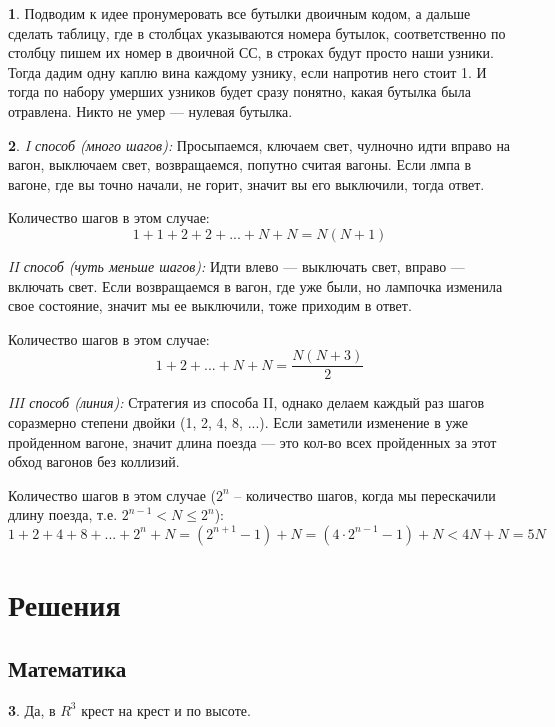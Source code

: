 \documentclass[14pt, a4paper]{extarticle}
\theoremstyle{definition}
\newtheorem{problem}{}
\theoremstyle{definition}
\theoremstyle{remark}
\numberwithin{equation}{section}
\begin{document}
\begin{problem}
    Подводим к идее пронумеровать все бутылки двоичным кодом, а дальше
    сделать таблицу, где в столбцах указываются номера бутылок, 
    соответственно по столбцу пишем их номер в двоичной СС, в строках
    будут просто наши узники. Тогда дадим одну каплю вина каждому 
    узнику, если напротив него стоит 1. И тогда по набору умерших узников
    будет сразу понятно, какая бутылка была отравлена. Никто не умер ---
    нулевая бутылка.
\end{problem}

\begin{problem}
    \textit{I способ (много шагов):} Просыпаемся, ключаем свет,
    чулночно идти вправо на вагон, выключаем свет, возвращаемся, попутно
    считая вагоны. Если лмпа в вагоне, где вы точно начали, не горит,
    значит вы его выключили, тогда ответ.

    Количество шагов в этом случае: 
    \[1 + 1 + 2 + 2 + ... + N + N = N(N + 1)\]

    \textit{II способ (чуть меньше шагов):} Идти влево --- выключать свет, вправо
    --- включать свет. Если возвращаемся в вагон, где уже были, но лампочка
    изменила свое состояние, значит мы ее выключили, тоже приходим в ответ.

    Количество шагов в этом случае: 
    \[1 + 2 + ... + N + N = \frac{N(N + 3)}{2}\] 

    \textit{III способ (линия):} Стратегия из способа II, однако
    делаем каждый раз шагов соразмерно степени двойки (1, 2, 4, 8, ...).
    Если заметили изменение в уже пройденном вагоне, значит длина поезда
    --- это кол-во всех пройденных за этот обход вагонов без коллизий.

    Количество шагов в этом случае ($2^n$ -- количество шагов, когда мы 
    перескачили длину поезда, т.е. $2^{n - 1} < N \leqslant 2^n$): 
    \[1 + 2 + 4 + 8 + ... + 2^n + N = (2^{n + 1} - 1) + N =
    (4 \cdot 2^{n - 1} - 1) + N < 4N + N = 5N\]
\end{problem}

\section*{Решения}
\subsection*{Математика}
\setcounter{problem}{0}

\begin{problem}
    Да, в $R^3$ крест на крест и по высоте.
\end{problem}
\end{document}
